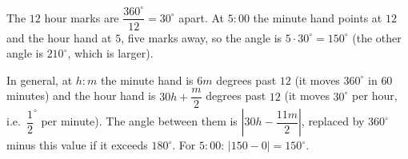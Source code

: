 The $12$ hour marks are $\dfrac{360^\circ}{12}=30^\circ$ apart. At $5{:}00$ the minute hand points at $12$ and the hour hand at $5$, five marks away, so the angle is $5\cdot30^\circ=\boxed{150^\circ}$ (the other angle is $210^\circ$, which is larger).

In general, at $h{:}m$ the minute hand is $6m$ degrees past $12$ (it moves $360^\circ$ in $60$ minutes) and the hour hand is $30h+\dfrac {m}{2}$ degrees past $12$ (it moves $30^\circ$ per hour, i.e.\ $\dfrac{1}{2}^\circ$ per minute). The angle between them is $\left|30h-\dfrac{11m}{2}\right|$, replaced by $360^\circ$ minus this value if it exceeds $180^\circ$. For $5{:}00$: $|150-0|=150^\circ$.
